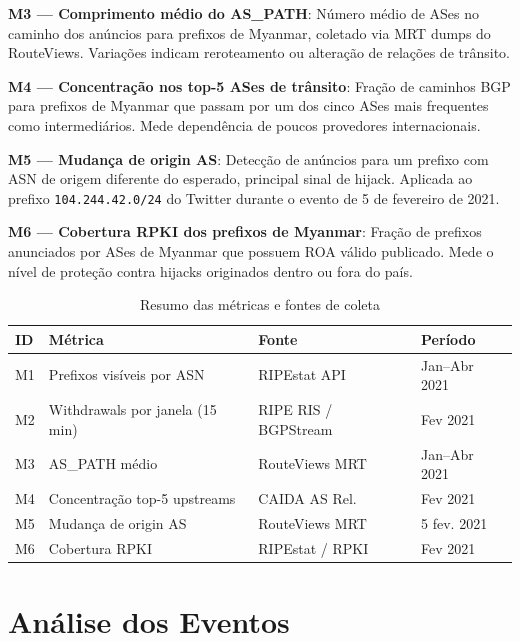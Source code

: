 \documentclass[12pt]{article}
\begin{document}
\textbf{M3 --- Comprimento médio do AS\_PATH}: Número médio de ASes no caminho
dos anúncios para prefixos de Myanmar, coletado via MRT dumps do RouteViews.
Variações indicam reroteamento ou alteração de relações de trânsito.

\textbf{M4 --- Concentração nos top-5 ASes de trânsito}: Fração de caminhos
BGP para prefixos de Myanmar que passam por um dos cinco ASes mais frequentes
como intermediários. Mede dependência de poucos provedores internacionais.

\textbf{M5 --- Mudança de origin AS}: Detecção de anúncios para um prefixo
com ASN de origem diferente do esperado, principal sinal de hijack. Aplicada
ao prefixo \texttt{104.244.42.0/24} do Twitter durante o evento de 5 de
fevereiro de 2021.

\textbf{M6 --- Cobertura RPKI dos prefixos de Myanmar}: Fração de prefixos
anunciados por ASes de Myanmar que possuem ROA válido publicado. Mede o nível
de proteção contra hijacks originados dentro ou fora do país.

\begin{table}[ht]
\centering
\caption{Resumo das métricas e fontes de coleta}
\label{tab:metricas}
\begin{tabular}{@{}llll@{}}
\toprule
\textbf{ID} & \textbf{Métrica} & \textbf{Fonte} & \textbf{Período} \\
\midrule
M1 & Prefixos visíveis por ASN       & RIPEstat API    & Jan--Abr 2021 \\
M2 & Withdrawals por janela (15 min) & RIPE RIS / BGPStream & Fev 2021 \\
M3 & AS\_PATH médio                  & RouteViews MRT  & Jan--Abr 2021 \\
M4 & Concentração top-5 upstreams    & CAIDA AS Rel.   & Fev 2021 \\
M5 & Mudança de origin AS            & RouteViews MRT  & 5 fev. 2021 \\
M6 & Cobertura RPKI                  & RIPEstat / RPKI & Fev 2021 \\
\bottomrule
\end{tabular}
\end{table}


\section{Análise dos Eventos}
\end{document}
